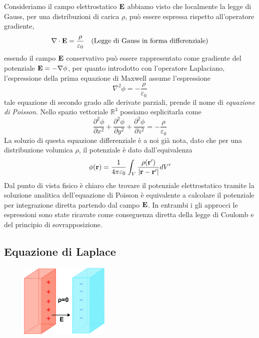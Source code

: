 Consideriamo il campo elettrostatico $\bold{E}$ abbiamo visto che localmente la legge di Gauss, per una distribuzioni di carica $\rho$, pu\`o essere espressa rispetto all'operatore gradiente, 
\begin{equation*}
	\nabla \cdot \bold{E} = \frac{\rho}{\varepsilon_0} \quad \text{(Legge di Gauss in forma differenziale)}
\end{equation*}
essendo il campo $\bold{E}$ conservativo pu\`o essere rappresentato come gradiente del potenziale $\bold{E} = - \nabla \phi$, per quanto introdotto con l'operatore Laplaciano, l'espressione della prima equazione di Maxwell assume l'espressione 
\begin{equation}
	\nabla^2\phi = - \frac{\rho}{\varepsilon_0}
\end{equation}
tale equazione di secondo grado alle derivate parziali, prende il nome di \textit{equazione di Poisson}. Nello spazio vettoriale $\mathbb{R}^3$ possiamo esplicitarla come
\begin{equation}
	\frac{\partial^2 \phi}{\partial x^2} + \frac{\partial^2 \phi}{\partial y^2} + \frac{\partial^2 \phi}{\partial z^2} = - \frac{\rho}{\varepsilon_0}
\end{equation}
La soluzio di questa equazione differenziale \`e a noi gi\`a nota, dato che per una distribuzione volumica $\rho$, il potenziale \`e dato dall'equivalenza 
\begin{equation*}
	\phi(\bold{r}) = \frac{1}{4 \pi \varepsilon_0} \int_{V} \frac{\rho(\bold{r'})}{|\bold{r} - \bold{r}'|}dV'
\end{equation*}
Dal punto di vista fisico \`e chiaro che trovare il potenziale elettrostatico tramite la soluzione analitica dell'equazione di Poisson \`e equivalente a calcolare il potenziale per integrazione diretta partendo dal campo $\bold{E}$. In entrambi i gli approcci le espressioni sono state ricavate come conseguenza diretta della legge di Coulomb e del principio di sovrapposizione.

\subsection{Equazione di Laplace}

\begin{figure}
    \centering
    \includegraphics[width=0.38\textwidth]{images/lap} %
    \vspace{0.5cm}
\end{figure}

